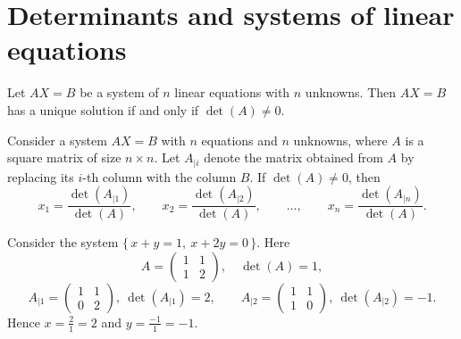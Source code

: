 \section{Determinants and systems of linear equations}

\begin{theorem}
Let $AX=B$ be a system of $n$ linear equations with $n$ unknowns. Then $AX=B$ has a unique solution if and
only if $\det(A)\neq 0$.
\end{theorem}

\begin{theorem}
Consider a system $AX=B$ with $n$ equations and $n$ unknowns, where $A$ is a square matrix of size
$n\times n$. Let $A_{|i}$ denote the matrix obtained from $A$ by replacing its $i$-th column with the column
$B$. If $\det(A)\neq 0$, then
\[
x_1 = \frac{\det(A_{|1})}{\det(A)}, \qquad
x_2 = \frac{\det(A_{|2})}{\det(A)}, \qquad
\ldots, \qquad
x_n = \frac{\det(A_{|n})}{\det(A)}.
\]
\end{theorem}

\begin{example}
Consider the system $\{\,x+y = 1,\ x+2y = 0\,\}$. Here
\[
A = \left ( \begin{array}{cc} 1 & 1\\ 1 & 2 \end{array} \right ), \quad \det(A) = 1,
\]
\[
A_{|1} = \left ( \begin{array}{cc} 1 & 1\\ 0 & 2 \end{array} \right ), \ \det(A_{|1}) = 2, \qquad
A_{|2} = \left ( \begin{array}{cc} 1 & 1\\ 1 & 0 \end{array} \right ), \ \det(A_{|2}) = -1.
\]
Hence $x=\tfrac{2}{1}=2$ and $y=\tfrac{-1}{1}=-1$.
\end{example}

